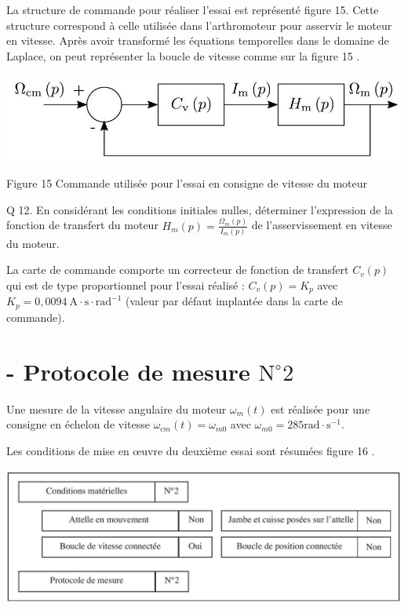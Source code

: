 \documentclass[10pt]{article}
\begin{document}
La structure de commande pour réaliser l'essai est représenté figure 15. Cette structure correspond à celle utilisée dans l'arthromoteur pour asservir le moteur en vitesse. Après avoir transformé les équations temporelles dans le domaine de Laplace, on peut représenter la boucle de vitesse comme sur la figure 15 .

\begin{center}
\includegraphics[max width=\textwidth]{2024_07_14_a83aebba33898893d39fg-10}
\end{center}

Figure 15 Commande utilisée pour l'essai en consigne de vitesse du moteur

Q 12. En considérant les conditions initiales nulles, déterminer l'expression de la fonction de transfert du moteur $H_{m}(p)=\frac{\Omega_{m}(p)}{I_{m}(p)}$ de l'asservissement en vitesse du moteur.

La carte de commande comporte un correcteur de fonction de transfert $C_{v}(p)$ qui est de type proportionnel pour l'essai réalisé : $C_{v}(p)=K_{p}$ avec $K_{p}=0,0094 \mathrm{~A} \cdot \mathrm{s} \cdot \mathrm{rad}^{-1}$ (valeur par défaut implantée dans la carte de commande).

\section*{- Protocole de mesure $\mathrm{N}^{\circ} 2$}
Une mesure de la vitesse angulaire du moteur $\omega_{m}(t)$ est réalisée pour une consigne en échelon de vitesse $\omega_{c m}(t)=\omega_{m 0}$ avec $\omega_{m 0}=285 \mathrm{rad} \cdot \mathrm{s}^{-1}$.

Les conditions de mise en œuvre du deuxième essai sont résumées figure 16 .

\begin{center}
\includegraphics[max width=\textwidth]{2024_07_14_a83aebba33898893d39fg-10(1)}
\end{center}
\end{document}
